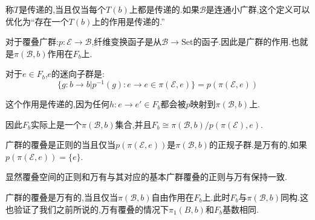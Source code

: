 称$T$是传递的,当且仅当每个$T(b)$上都是传递的.如果$\mathcal{B}$是连通小广群,这个定义可以优化为“存在一个$T(b)$上的作用是传递的.”

\begin{example}
    对于覆叠广群:$p:\mathcal{E}\to \mathcal{B}$,纤维变换函子是从$\mathcal{B}\to \mathrm{Set}$的函子.因此是广群的作用.也就是$\pi(\mathcal{B},b)$作用在$F_b$上.

    对于$e \in F_b$,$e$的迷向子群是:
    $$
    \{g:b \to b|p^{-1}(g):e \to e \in \pi(\mathcal{E},e)\}=p(\pi(\mathcal{E},e))
    $$
    
    这个作用是传递的,因为任何$h:e \to e' \in F_b$都会被$p$映射到$\pi(\mathcal{B},b)$上.

    因此$F_b$实际上是一个$\pi(\mathcal{B},b)$集合,并且$F_b \cong \pi(\mathcal{B},b)/p(\pi(\mathcal{E}),e)$.
\end{example}
\begin{definition}
    广群的覆叠是正则的当且仅当$p(\pi(\mathcal{E},e))$是$\pi(\mathcal{B},b)$的正规子群.是万有的,如果$p(\pi(\mathcal{E},e))=\{e\}$.

    显然覆叠空间的正则和万有与其对应的基本广群覆叠的正则与万有保持一致.

\end{definition}
\begin{proposition}
    广群的覆叠是万有的,当且仅当$\pi(\mathcal{B},b)$自由作用在$F_b$上.此时$F_b$与$\pi(\mathcal{B},b)$同构.这也验证了我们之前所说的,万有覆叠的情况下$\pi_1(B,b)$和$F_b$基数相同.
\end{proposition}
